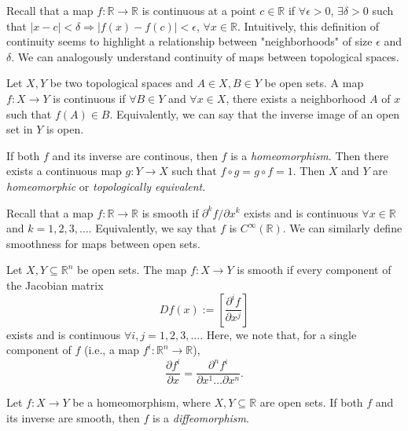 \documentclass{article}
\begin{document}
Recall that a map $f: \mathbb{R} \rightarrow \mathbb{R}$ is continuous at a point $c \in \mathbb{R}$ if $\forall \epsilon > 0$, $\exists \delta > 0$ such that $|x - c| < \delta \Rightarrow |f(x) - f(c)| < \epsilon$, $\forall x \in \mathbb{R}$. Intuitively, this definition of continuity seems to highlight a relationship between "neighborhoods" of size $\epsilon$ and $\delta$. We can analogously understand continuity of maps between topological spaces. 

Let $X, Y$ be two topological spaces and $A \in X, B \in Y$ be open sets. A map $f: X \rightarrow Y$ is continuous if $\forall B \in Y$ and $\forall x \in X$, there exists a neighborhood $A$ of $x$ such that $f(A) \in B$. Equivalently, we can say that the inverse image of an open set in $Y$ is open.

If both $f$ and its inverse are continous, then $f$ is a \textit{homeomorphism}. Then there exists a continuous map $g: Y \rightarrow X$ such that $f \circ g = g \circ f = 1$. Then $X$ and $Y$ are \textit{homeomorphic} or \textit{topologically equivalent}.

Recall that a map $f: \mathbb{R} \rightarrow \mathbb{R}$ is smooth if $\partial^k f / \partial x^k$ exists and is continuous $\forall x \in \mathbb{R}$ and $k = 1, 2, 3, \ldots$. Equivalently, we say that $f$ is $C^{\infty}(\mathbb{R})$. We can similarly define smoothness for maps between open sets. 

Let $X, Y \subseteq \mathbb{R}^n$ be open sets. The map $f: X \rightarrow Y$ is smooth if every component of the Jacobian matrix 
\begin{equation}
Df(x) := \left [ \frac{\partial^i f}{\partial x^j} \right ] 
\end{equation}
exists and is continuous $\forall i, j = 1, 2, 3, \ldots$. Here, we note that, for a single component of $f$ (i.e., a map $f^i: \mathbb{R}^n \rightarrow \mathbb{R}$),
\begin{equation}
\frac{\partial f^i}{\partial x} = \frac{\partial^n f^i}{\partial x^1 \ldots \partial x^n}.
\end{equation}

Let $f: X \rightarrow Y$ be a homeomorphism, where $X, Y \subseteq \mathbb{R}$ are open sets. If both $f$ and its inverse are smooth, then $f$ is a \textit{diffeomorphism}.
\end{document}

